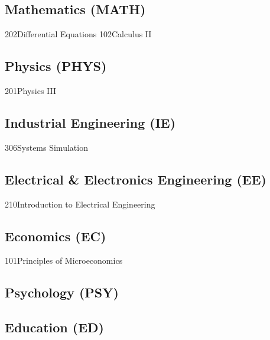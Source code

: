 \documentclass[11pt,a4paper,sans]{moderncv}
\begin{document}
\vspace{1ex}
\subsection{Mathematics (MATH)}
   {202}{Differential Equations}
               {102}{Calculus II}

\vspace{1ex}
\subsection{Physics (PHYS)}
                              {201}{Physics III}

\vspace{1ex}
\subsection{Industrial Engineering (IE)}
		{306}{Systems Simulation}

\vspace{1ex}
\subsection{Electrical \& Electronics Engineering (EE)}
  {210}{Introduction to Electrical Engineering}

\vspace{1ex}
\subsection{Economics (EC)}
    {101}{Principles of Microeconomics}

\vspace{1ex}
\subsection{Psychology (PSY)}

\vspace{1ex}
\subsection{Education (ED)}
\end{document}
